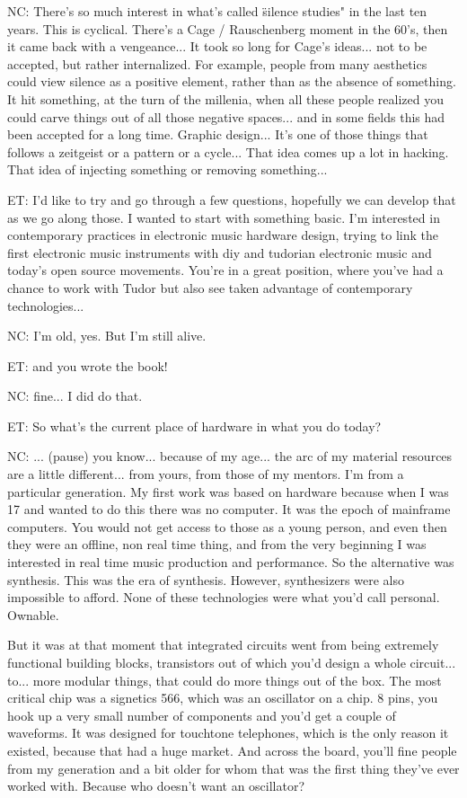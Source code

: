NC: There's so much interest in what's called \"silence studies" in the last ten years. This is cyclical. There's a Cage / Rauschenberg moment in the 60's, then it came back with a vengeance... It took so long for Cage's ideas... not to be accepted, but rather internalized. For example, people from many aesthetics could view silence as a positive element, rather than as the absence of something. It hit something, at the turn of the millenia, when all these people realized you could carve things out of all those negative spaces... and in some fields this had been accepted for a long time. Graphic design... It's one of those things that follows a zeitgeist or a pattern or a cycle... That idea comes up a lot in hacking. That idea of injecting something or removing something...

ET: I'd like to try and go through a few questions, hopefully we can develop that as we go along those. I wanted to start with something basic. I'm interested in contemporary practices in electronic music hardware design, trying to link the first electronic music instruments with diy and tudorian electronic music and today's open source movements. You're in a great position, where you've had a chance to work with Tudor but also see taken advantage of contemporary technologies...

NC: I'm old, yes. But I'm still alive. 

ET: and you wrote the book! 

NC: fine... I did do that. 

ET: So what's the current place of hardware in what you do today? 

NC: ... (pause) you know... because of my age... the arc of my material resources are a little different... from yours, from those of my mentors. I'm from a particular generation. My first work was based on hardware because when I was 17 and wanted to do this there was no computer. It was the epoch of mainframe computers. You would not get access to those as a young person, and even then they were an offline, non real time thing, and from the very beginning I was interested in real time music production and performance. So the alternative was synthesis. This was the era of synthesis. However, synthesizers were also impossible to afford. None of these technologies were what you'd call personal. Ownable. 

But it was at that moment that integrated circuits went from being extremely functional building blocks, transistors out of which you'd design a whole circuit... to... more modular things, that could do more things out of the box. The most critical chip was a signetics 566, which was an oscillator on a chip. 8 pins, you hook up a very small number of components and you'd get a couple of waveforms. It was designed for touchtone telephones, which is the only reason it existed, because that had a huge market. And across the board, you'll fine people from my generation and a bit older for whom that was the first thing they've ever worked with. Because who doesn't want an oscillator? 


